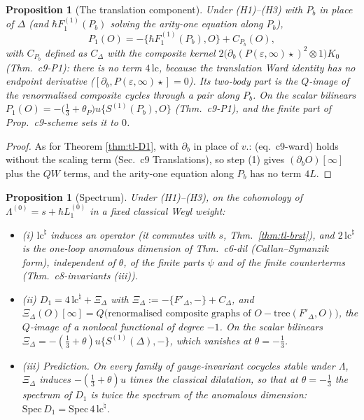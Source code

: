 \documentclass[11pt]{article}
\numberwithin{equation}{section}
\theoremstyle{plain}
\newtheorem{proposition}[theorem]{Proposition}
\theoremstyle{definition}
\begin{document}
\begin{proposition}[The translation component]
\label{prop:tl-P1}
Under (H1)--(H3) with $P_b$ in place of $\Delta$ (and $\hbar F_1^{(1)}(P_b)$ solving the arity-one equation along $P_b$),
\[
P_1(O)=-\{\hbar F_1^{(1)}(P_b),O\}+C_{P_b}(O),
\]
with $C_{P_b}$ defined as $C_\Delta$ with the composite kernel $2\big(\partial_b(P(\varepsilon,\infty)\star)^2\otimes1\big)K_0$ (Thm.~c9-P1): there is no term $4\,\mathrm{lc}$, because the translation Ward identity has no endpoint derivative ($[\partial_b,P(\varepsilon,\infty)\star]=0$). Its two-body part is the $Q$-image of the renormalised composite cycles through a pair along $P_b$. On the scalar bilinears $P_1(O)=-\big(\tfrac13+\theta_P\big)u\{S^{(1)}(P_b),O\}$ (Thm.~c9-P1), and the finite part of Prop.~c9-scheme sets it to $0$.
\end{proposition}

\begin{proof}
As for Theorem \ref{thm:tl-D1}, with $\partial_b$ in place of $v.$: (eq.~c9-ward) holds without the scaling term (Sec.~c9 Translations), so step (1) gives $(\partial_bO)[\infty]$ plus the $QW$ terms, and the arity-one equation along $P_b$ has no term $4L$.
\end{proof}

\begin{proposition}[Spectrum]
\label{prop:tl-spec}
Under (H1)--(H3), on the cohomology of $\Lambda^{(0)}=s+\hbar L_1^{(0)}$ in a fixed classical Weyl weight:
\begin{itemize}
\item (i) $\mathrm{lc}^\natural$ induces an operator (it commutes with $s$, Thm.~\ref{thm:tl-brst}), and $2\,\mathrm{lc}^\natural$ is the one-loop anomalous dimension of Thm.~c6-dil (Callan--Symanzik form), independent of $\theta$, of the finite parts $\psi$ and of the finite counterterms (Thm.~c8-invariants (iii)).
\item (ii) $D_1=4\,\mathrm{lc}^\natural+\Xi_\Delta$ with $\Xi_\Delta:=-\{F'_\Delta,-\}+C_\Delta$, and $\Xi_\Delta(O)[\infty]=Q\big(\text{renormalised composite graphs of }O-\mathrm{tree}(F'_\Delta,O)\big)$, the $Q$-image of a nonlocal functional of degree $-1$. On the scalar bilinears $\Xi_\Delta=-(\tfrac13+\theta)u\{S^{(1)}(\Delta),-\}$, which vanishes at $\theta=-\tfrac13$.
\item (iii) Prediction. On every family of gauge-invariant cocycles stable under $\Lambda$, $\Xi_\Delta$ induces $-(\tfrac13+\theta)u$ times the classical dilatation, so that at $\theta=-\tfrac13$ the spectrum of $D_1$ is twice the spectrum of the anomalous dimension: $\mathrm{Spec}\,D_1=\mathrm{Spec}\,4\,\mathrm{lc}^\natural$.
\end{itemize}
\end{proposition}
\end{document}
